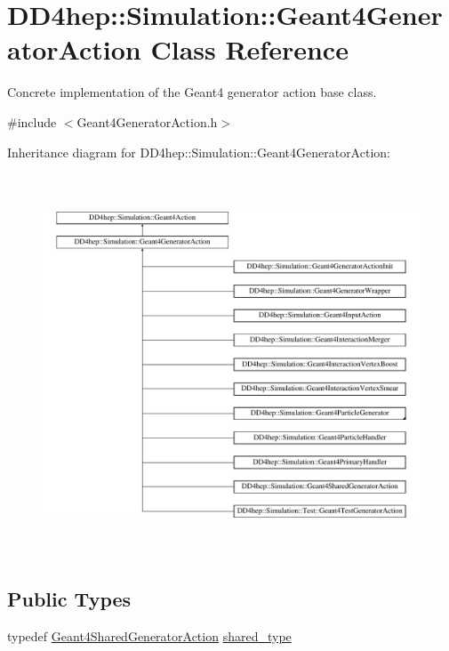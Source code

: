 \hypertarget{class_d_d4hep_1_1_simulation_1_1_geant4_generator_action}{}\section{D\+D4hep\+:\+:Simulation\+:\+:Geant4\+Generator\+Action Class Reference}
\label{class_d_d4hep_1_1_simulation_1_1_geant4_generator_action}


Concrete implementation of the Geant4 generator action base class.  




{\ttfamily \#include $<$Geant4\+Generator\+Action.\+h$>$}

Inheritance diagram for D\+D4hep\+:\+:Simulation\+:\+:Geant4\+Generator\+Action\+:\begin{figure}[H]
\begin{center}
\leavevmode
\includegraphics[height=11.375000cm]{class_d_d4hep_1_1_simulation_1_1_geant4_generator_action}
\end{center}
\end{figure}
\subsection*{Public Types}
\begin{DoxyCompactItemize}
\item 
typedef \hyperlink{class_d_d4hep_1_1_simulation_1_1_geant4_shared_generator_action}{Geant4\+Shared\+Generator\+Action} \hyperlink{class_d_d4hep_1_1_simulation_1_1_geant4_generator_action_a21b579b261763b82cb86a001c8502c65}{shared\+\_\+type}
\end{DoxyCompactItemize}
